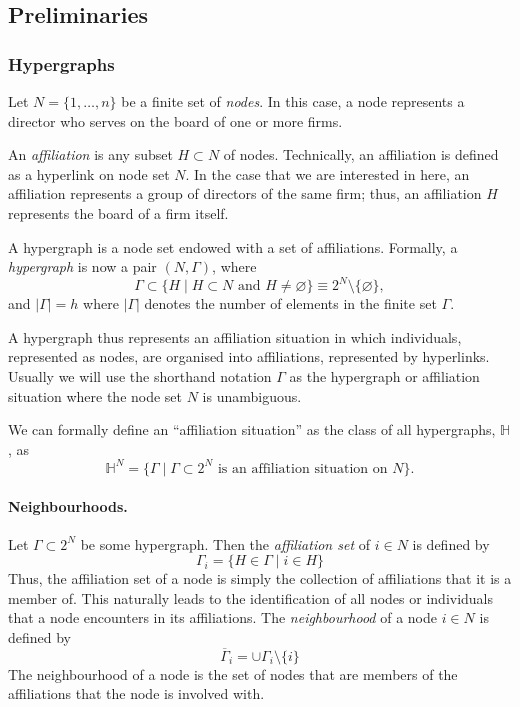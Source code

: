 \subsection{Preliminaries}

\subsubsection*{Hypergraphs}

Let $N = \{ 1, \ldots ,n \}$ be a finite set of \emph{nodes}. In this case, a node represents a director who serves on the board of one or more firms.

An \emph{affiliation} is any subset $H \subset N$ of nodes. Technically, an affiliation is defined as a hyperlink on node set $N$. In the case that we are interested in here, an affiliation represents a group of directors of the same firm; thus, an affiliation $H$ represents the board of a firm itself.

A hypergraph is a node set endowed with a set of affiliations. Formally, a \emph{hypergraph} is now a pair $(N, \Gamma )$, where
\begin{equation}
\Gamma \subset \{ H \mid H \subset N \mbox{ and } H \neq \varnothing \} \equiv 2^N \setminus \{\varnothing\} ,
\end{equation}
and $| \Gamma | = h$ where $| \Gamma |$ denotes the number of elements in the finite set $\Gamma$.

A hypergraph thus represents an affiliation situation in which individuals, represented as nodes, are organised into affiliations, represented by hyperlinks. Usually we will use the shorthand notation $\Gamma$ as the hypergraph or affiliation situation where the node set $N$ is unambiguous.

We can formally define an ``affiliation situation'' as the class of all hypergraphs, $\mathbb{H}$, as
\begin{equation}
\mathbb{H}^N = \{ \Gamma \mid \Gamma \subset 2^N \mbox{ is an affiliation situation on } N \} .
\end{equation}

\paragraph{Neighbourhoods.}

Let $\Gamma \subset 2^N$ be some hypergraph. Then the \emph{affiliation set} of $i \in N$ is defined by
\begin{equation}
\Gamma_i = \{ H \in \Gamma \mid i \in H \}
\end{equation}
Thus, the affiliation set of a node is simply the collection of affiliations that it is a member of. This naturally leads to the identification of all nodes or individuals that a node encounters in its affiliations. The \emph{neighbourhood} of a node $i \in N$ is defined by
\begin{equation}
\overline{\Gamma}_i = \cup \Gamma_i \setminus \{ i \}
\end{equation}
The neighbourhood of a node is the set of nodes that are members of the affiliations that the node is involved with.

